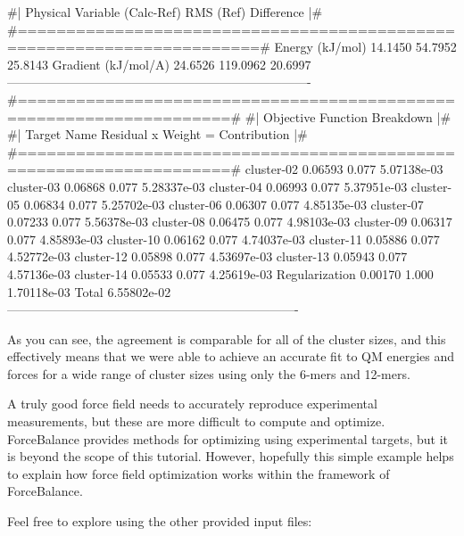 \begin{DoxyVerb}
 #|  Physical Variable           (Calc-Ref)     RMS (Ref)   Difference  |#
 #=======================================================================#
     Energy (kJ/mol)                14.1450       54.7952     25.8143%
     Gradient (kJ/mol/A)            24.6526      119.0962     20.6997%
 -------------------------------------------------------------------------
 #====================================================================#
 #|                   Objective Function Breakdown                   |#
 #|   Target Name              Residual  x  Weight  =  Contribution  |#
 #====================================================================#
 cluster-02                     0.06593      0.077      5.07138e-03 
 cluster-03                     0.06868      0.077      5.28337e-03 
 cluster-04                     0.06993      0.077      5.37951e-03 
 cluster-05                     0.06834      0.077      5.25702e-03 
 cluster-06                     0.06307      0.077      4.85135e-03 
 cluster-07                     0.07233      0.077      5.56378e-03 
 cluster-08                     0.06475      0.077      4.98103e-03 
 cluster-09                     0.06317      0.077      4.85893e-03 
 cluster-10                     0.06162      0.077      4.74037e-03 
 cluster-11                     0.05886      0.077      4.52772e-03 
 cluster-12                     0.05898      0.077      4.53697e-03 
 cluster-13                     0.05943      0.077      4.57136e-03 
 cluster-14                     0.05533      0.077      4.25619e-03 
 Regularization                 0.00170      1.000      1.70118e-03 
 Total                                                  6.55802e-02 
 ----------------------------------------------------------------------\end{DoxyVerb}


As you can see, the agreement is comparable for all of the cluster sizes, and this effectively means that we were able to achieve an accurate fit to QM energies and forces for a wide range of cluster sizes using only the 6-\/mers and 12-\/mers.

A truly good force field needs to accurately reproduce experimental measurements, but these are more difficult to compute and optimize. Force\+Balance provides methods for optimizing using experimental targets, but it is beyond the scope of this tutorial. However, hopefully this simple example helps to explain how force field optimization works within the framework of Force\+Balance.

Feel free to explore using the other provided input files\+:

